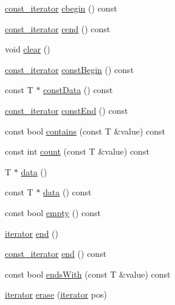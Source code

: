 \begin{DoxyCompactItemize}
\item 
\hyperlink{classprism_1_1_vector_acc6ed07e2d7ed5065feec92a83e46fa4}{const\+\_\+iterator} \hyperlink{classprism_1_1_vector_a3cb4a9878dfd0b58b8e0a5c01f5d37f5}{cbegin} () const 
\item 
\hyperlink{classprism_1_1_vector_acc6ed07e2d7ed5065feec92a83e46fa4}{const\+\_\+iterator} \hyperlink{classprism_1_1_vector_a3ac39de85562660281a0fd7601ef203b}{cend} () const 
\item 
void \hyperlink{classprism_1_1_vector_acb8a681b958856d257b145930014c6fa}{clear} ()
\item 
\hyperlink{classprism_1_1_vector_acc6ed07e2d7ed5065feec92a83e46fa4}{const\+\_\+iterator} \hyperlink{classprism_1_1_vector_a6d03b3bb9cc1292e1698674080ff3334}{const\+Begin} () const 
\item 
const T $\ast$ \hyperlink{classprism_1_1_vector_a6e6fee098958130862af58cafeb27d65}{const\+Data} () const 
\item 
\hyperlink{classprism_1_1_vector_acc6ed07e2d7ed5065feec92a83e46fa4}{const\+\_\+iterator} \hyperlink{classprism_1_1_vector_a99331f9557172b3e3e34fb36f23e5cc5}{const\+End} () const 
\item 
const bool \hyperlink{classprism_1_1_vector_a6b21bf92cde4f91cb8d14efb4e315ea0}{contains} (const T \&value) const 
\item 
const int \hyperlink{classprism_1_1_vector_ad40e1dc908502680797f37312dda7a4f}{count} (const T \&value) const 
\item 
T $\ast$ \hyperlink{classprism_1_1_vector_a0da05f1f73ce9b35f3837bb7fca4a81e}{data} ()
\item 
const T $\ast$ \hyperlink{classprism_1_1_vector_a148789766065acd9338e8e6d4dcbdd2d}{data} () const 
\item 
const bool \hyperlink{classprism_1_1_vector_ad710950cfeaaf977ef629e69fc39b5a7}{empty} () const 
\item 
\hyperlink{classprism_1_1_vector_aa547779173a63f6f8c9b2887498d10eb}{iterator} \hyperlink{classprism_1_1_vector_a329f8549c259232b232e8f361bc4bcb1}{end} ()
\item 
\hyperlink{classprism_1_1_vector_acc6ed07e2d7ed5065feec92a83e46fa4}{const\+\_\+iterator} \hyperlink{classprism_1_1_vector_a0a5a10cd6cd6790d2b3e2546af742fc9}{end} () const 
\item 
const bool \hyperlink{classprism_1_1_vector_ae214a9cce9ac8cc215893eee20fd0e44}{ends\+With} (const T \&value) const 
\item 
\hyperlink{classprism_1_1_vector_aa547779173a63f6f8c9b2887498d10eb}{iterator} \hyperlink{classprism_1_1_vector_a540d12132c9a971d469c9d53a954f322}{erase} (\hyperlink{classprism_1_1_vector_aa547779173a63f6f8c9b2887498d10eb}{iterator} pos)

\end{DoxyCompactItemize}
